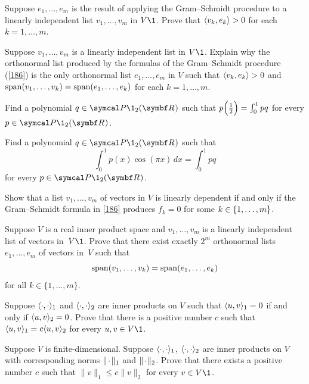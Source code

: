 \begin{exercises}
\exercise
Suppose $e_1, \dots, e_m$ is the result of applying the Gram--Schmidt procedure to a linearly independent list $v_1, \dots, v_m$ in $V\1$. Prove that $\langle v_k, e_k\rangle > 0$ for each $k = 1, \dots, m$.


\exercise
Suppose $v_1, \dots, v_m$ is a linearly independent list in $V\1$. Explain why the orthonormal list produced by the formulas of the Gram--Schmidt procedure (\ref{186}) is the only orthonormal list $e_1, \ldots, e_m$ in $V$ such that $\langle v_k, e_k\rangle > 0$ and
$\operatorname{span}(v_1, \ldots, v_k) = \operatorname{span}(e_1, \ldots, e_k)$ for each $k = 1, \ldots, m$. \label{8GSunique}


\exercise
Find a polynomial $q \in \P\1_2(\R{})$ such that
$
p\paren[\Big]{\tfrac{1}{2}} = \int_0^1 pq$
for every $p \in \P\1_2(\R{})$.\label{6int}


\exercise
Find a polynomial $q \in \P\1_2(\R{})$ such that
\[
\int_0^1 p(x) \cos(\pi x) \,dx = \int_0^1 pq
\]
for every $p \in \P\1_2(\R{})$.


\exercise
Show that a list $v_1, \ldots, v_m$ of vectors in $V$ is linearly dependent if and only if the Gram--Schmidt formula in \ref{186} produces $f_k= 0$ for some $k \in \{1, \ldots, m\}$.\label{GSlindep}%


\exercise
Suppose $V$ is a real inner product space and $v_1, \dots, v_m$ is a
linearly independent list of vectors in~$V\1$.  Prove that there exist exactly
$2^m$ orthonormal lists $e_1, \dots, e_m$ of vectors
in~$V$ such  that
\[
\operatorname{span} (v_1, \dots, v_k) = \operatorname{span} (e_1, \dots, e_k)
\]
for all $k \in \{1, \dots, m\}$.


\exercise
Suppose $\langle \cdot, \cdot\rangle_1$ and $\langle \cdot, \cdot\rangle_2$ are inner products on $V$ such that $\langle u,v\rangle_1 = 0$ if and only if $\langle u,v\rangle_2= 0$. Prove that there is a positive number $c$ such that $\langle u, v\rangle_1 = c \langle u, v\rangle_2$ for every $u, v \in V\1$.


\exercise
Suppose $V$ is finite-dimensional. Suppose $\langle \cdot, \cdot\rangle_1$, $\langle \cdot, \cdot\rangle_2$ are inner products on $V$ with corresponding norms $\lVert \mskip2mu \cdot \mskip2mu \rVert_1$ and $\lVert\mskip2mu \cdot \mskip2mu\rVert_2$. Prove that there exists a positive number $c$ such that
$
\| v \|_1 \le c \| v \|_2
$
for every $v \in V\1$.



\end{exercises}
